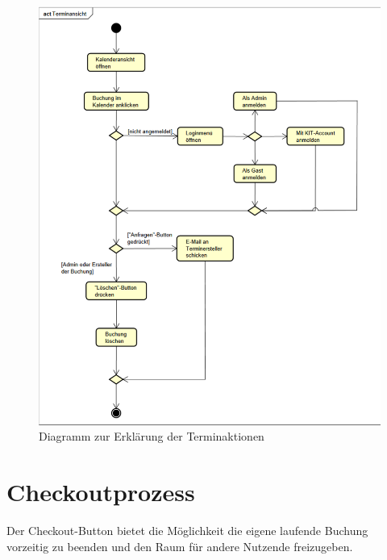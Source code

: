 \begin{figure}[ht]
    \centering
    \includegraphics[width=\textwidth]{figures/activity/terminansicht}
    \caption{Diagramm zur Erklärung der Terminaktionen}
    \label{fig:booking-actions-diagram}
\end{figure}
\clearpage

\section{Checkoutprozess}

Der Checkout-Button bietet die Möglichkeit die eigene laufende Buchung vorzeitig zu beenden und den Raum für andere Nutzende freizugeben.

